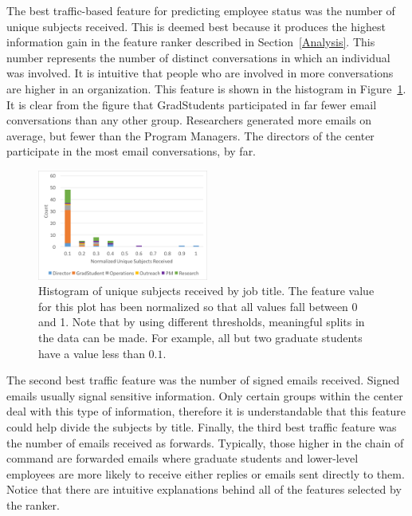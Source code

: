 \documentclass{article}
\begin{document}
The best traffic-based feature for predicting employee status was the number of unique subjects received.  This is deemed best because it produces the highest information gain in the feature ranker described in Section~\ref{Analysis}.  This number represents the number of distinct conversations in which an individual was involved.  It is intuitive that people who are involved in more conversations are higher in an organization.  This feature is shown in the histogram in Figure~\ref{fig:traffic_ex_hist}.  It is clear from the figure that GradStudents participated in far fewer email conversations than any other group.  Researchers generated more emails on average, but fewer than the Program Managers.  The directors of the center participate in the most email conversations, by far. 
\begin{figure}[H]
    \centering
        \includegraphics[width=0.5\textwidth]{Unique_subjects_rec_hist}
        \caption{Histogram of unique subjects received by job title.  The feature value for this plot has been normalized so that all values fall between 0 and 1.  Note that by using different thresholds, meaningful splits in the data can be made.  For example, all but two graduate students have a value less than $0.1$.}
        \label{fig:traffic_ex_hist}
\end{figure}

The second best traffic feature was the number of signed emails received.  Signed emails usually signal sensitive information.  Only certain groups within the center deal with this type of information, therefore it is understandable that this feature could help divide the subjects by title.  Finally, the third best traffic feature was the number of emails received as forwards.  Typically, those higher in the chain of command are forwarded emails where graduate students and lower-level employees are more likely to receive either replies or emails sent directly to them.  Notice that there are intuitive explanations behind all of the features selected by the ranker.
\end{document}
